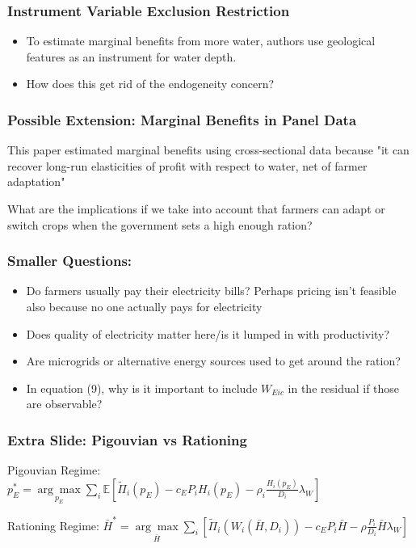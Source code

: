 \documentclass[aspectratio=169]{beamer}
\begin{document}
\begin{frame}
    \frametitle{Instrument Variable Exclusion Restriction}
    \label{endogeneity}
    \begin{itemize}
        \item To estimate marginal benefits from more water, authors use geological features as an instrument for water depth. \hyperlink{hedonic}{}
        \item How does this get rid of the endogeneity concern?
    \end{itemize}
    \note{
    {\footnotesize
    \begin{itemize}
        \item 
    \end{itemize}
    }}
\end{frame}

\begin{frame}
    \frametitle{Possible Extension: Marginal Benefits in Panel Data}
    This paper estimated marginal benefits using cross-sectional data because "it can recover long-run elasticities of profit with respect to water, net of farmer adaptation"

    What are the implications if we take into account that farmers can adapt or switch crops when the government sets a high enough ration?
\end{frame}

\begin{frame}
    \frametitle{Smaller Questions:}
    \begin{itemize}
        \item Do farmers usually pay their electricity bills? Perhaps pricing isn't feasible also because no one actually pays for electricity
        \item Does quality of electricity matter here/is it lumped in with productivity?
        \item Are microgrids or alternative energy sources used to get around the ration?
        \item In equation (9), why is it important to include $W_{Eic}$ in the residual if those are observable?
    \end{itemize}
\end{frame}

\begin{frame}
    \frametitle{Extra Slide: Pigouvian vs Rationing}
    \label{pigouvian}
    Pigouvian Regime: $p_{E}^{*}=\underset{p_{E}}{\arg \max } \sum_{i} \mathbb{E}\left[\widetilde{\Pi}_{i}\left(p_{E}\right)-c_{E} P_{i} H_{i}\left(p_{E}\right)-\rho_{i} \frac{H_{i}\left(p_{E}\right)}{D_{i}} \lambda_{W}\right]$

    Rationing Regime: $\bar{H}^* = \underset{\bar{H}}{\arg \max}\sum_{i}\left[\widetilde{\Pi}_{i}\left(W_{i}\left(\bar{H}, D_{i}\right)\right)-c_{E} P_{i} \bar{H}-\rho \frac{P_{i}}{D_{i}} \bar{H} \lambda_{W}\right]$
    \vfill
\end{frame}
\end{document}
